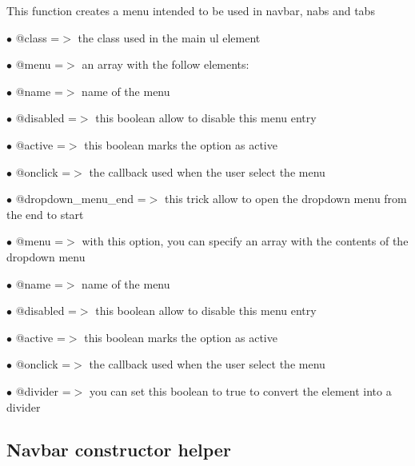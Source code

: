 \documentclass[a4paper]{book}
\begin{document}
This function creates a menu intended to be used in navbar, nabs and tabs

\begin{compactitem}
\item[\color{myblue}$\bullet$] @class =$>$ the class used in the main ul element
\item[\color{myblue}$\bullet$] @menu  =$>$ an array with the follow elements:
\end{compactitem}

\begin{compactitem}
\item[\color{myblue}$\bullet$] @name              =$>$ name of the menu
\item[\color{myblue}$\bullet$] @disabled          =$>$ this boolean allow to disable this menu entry
\item[\color{myblue}$\bullet$] @active            =$>$ this boolean marks the option as active
\item[\color{myblue}$\bullet$] @onclick           =$>$ the callback used when the user select the menu
\item[\color{myblue}$\bullet$] @dropdown\_menu\_end =$>$ this trick allow to open the dropdown menu from the end to start
\item[\color{myblue}$\bullet$] @menu              =$>$ with this option, you can specify an array with the contents of the dropdown menu
\end{compactitem}

\begin{compactitem}
\item[\color{myblue}$\bullet$] @name     =$>$ name of the menu
\item[\color{myblue}$\bullet$] @disabled =$>$ this boolean allow to disable this menu entry
\item[\color{myblue}$\bullet$] @active   =$>$ this boolean marks the option as active
\item[\color{myblue}$\bullet$] @onclick  =$>$ the callback used when the user select the menu
\item[\color{myblue}$\bullet$] @divider  =$>$ you can set this boolean to true to convert the element into a divider
\end{compactitem}

\hypertarget{toc411}{}
\subsection{Navbar constructor helper}
\end{document}
